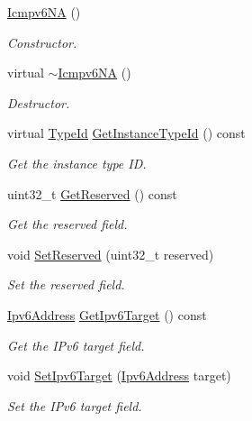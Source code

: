 \begin{DoxyCompactItemize}
\item 
\hyperlink{classns3_1_1Icmpv6NA_ab03440551d8eee4060b6d1a9ad9c0456}{Icmpv6\+NA} ()
\begin{DoxyCompactList}\small\item\em Constructor. \end{DoxyCompactList}\item 
virtual \hyperlink{classns3_1_1Icmpv6NA_ae6e504f0b58c4fafaec02de2ba4dc83e}{$\sim$\+Icmpv6\+NA} ()
\begin{DoxyCompactList}\small\item\em Destructor. \end{DoxyCompactList}\item 
virtual \hyperlink{classns3_1_1TypeId}{Type\+Id} \hyperlink{classns3_1_1Icmpv6NA_a81dbd12372411082492f9b772838e9fb}{Get\+Instance\+Type\+Id} () const 
\begin{DoxyCompactList}\small\item\em Get the instance type ID. \end{DoxyCompactList}\item 
uint32\+\_\+t \hyperlink{classns3_1_1Icmpv6NA_adad72a998b32cdbfd52f3ac15cdb802d}{Get\+Reserved} () const 
\begin{DoxyCompactList}\small\item\em Get the reserved field. \end{DoxyCompactList}\item 
void \hyperlink{classns3_1_1Icmpv6NA_abc6f4b1d10345a953363baf2411ea87c}{Set\+Reserved} (uint32\+\_\+t reserved)
\begin{DoxyCompactList}\small\item\em Set the reserved field. \end{DoxyCompactList}\item 
\hyperlink{classns3_1_1Ipv6Address}{Ipv6\+Address} \hyperlink{classns3_1_1Icmpv6NA_ab51a9d8accbef62b4ea6e73d96e54716}{Get\+Ipv6\+Target} () const 
\begin{DoxyCompactList}\small\item\em Get the I\+Pv6 target field. \end{DoxyCompactList}\item 
void \hyperlink{classns3_1_1Icmpv6NA_a73e0b219a279bfb59ef6af15ee916bdc}{Set\+Ipv6\+Target} (\hyperlink{classns3_1_1Ipv6Address}{Ipv6\+Address} target)
\begin{DoxyCompactList}\small\item\em Set the I\+Pv6 target field. \end{DoxyCompactList}\item 

\end{DoxyCompactItemize}

